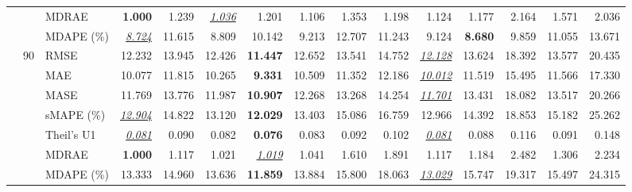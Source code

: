 \begin{table}[!htbp]
{\begin{tabular}{lllrrrrrrrrrrrr}
 &  & MDRAE & \textbf{1.000} & 1.239 & \underline{\textit{1.036}} & 1.201 & 1.106 & 1.353 & 1.198 & 1.124 & 1.177 & 2.164 & 1.571 & 2.036 \\
 &  & MDAPE (\%) & \underline{\textit{8.724}} & 11.615 & 8.809 & 10.142 & 9.213 & 12.707 & 11.243 & 9.124 & \textbf{8.680} & 9.859 & 11.055 & 13.671 \\
\cmidrule(lr){2-15}
 & 90 & RMSE & 12.232 & 13.945 & 12.426 & \textbf{11.447} & 12.652 & 13.541 & 14.752 & \underline{\textit{12.128}} & 13.624 & 18.392 & 13.577 & 20.435 \\
 &  & MAE & 10.077 & 11.815 & 10.265 & \textbf{9.331} & 10.509 & 11.352 & 12.186 & \underline{\textit{10.012}} & 11.519 & 15.495 & 11.566 & 17.330 \\
 &  & MASE & 11.769 & 13.776 & 11.987 & \textbf{10.907} & 12.268 & 13.268 & 14.254 & \underline{\textit{11.701}} & 13.431 & 18.082 & 13.517 & 20.266 \\
 &  & sMAPE (\%) & \underline{\textit{12.904}} & 14.822 & 13.120 & \textbf{12.029} & 13.403 & 15.086 & 16.759 & 12.966 & 14.392 & 18.853 & 15.182 & 25.262 \\
 &  & Theil's U1 & \underline{\textit{0.081}} & 0.090 & 0.082 & \textbf{0.076} & 0.083 & 0.092 & 0.102 & \underline{\textit{0.081}} & 0.088 & 0.116 & 0.091 & 0.148 \\
 &  & MDRAE & \textbf{1.000} & 1.117 & 1.021 & \underline{\textit{1.019}} & 1.041 & 1.610 & 1.891 & 1.117 & 1.184 & 2.482 & 1.306 & 2.234 \\
 &  & MDAPE (\%) & 13.333 & 14.960 & 13.636 & \textbf{11.859} & 13.884 & 15.800 & 18.063 & \underline{\textit{13.029}} & 15.747 & 19.317 & 15.497 & 24.315 \\
\bottomrule
\end{tabular}}
\end{table}
